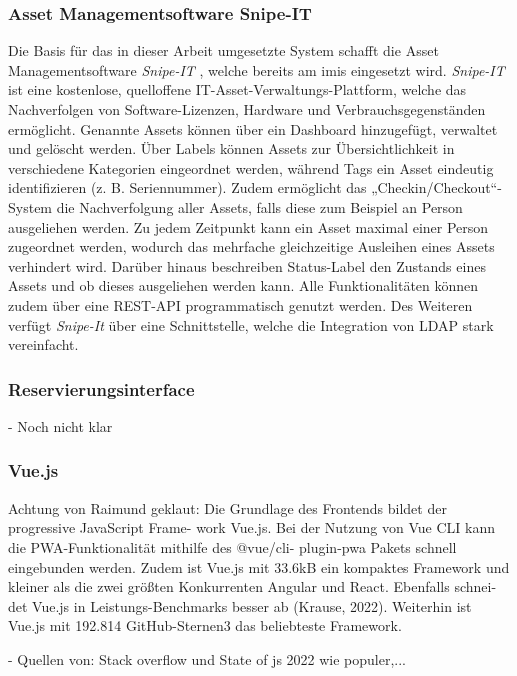 \subsubsection{Asset Managementsoftware Snipe-IT}

Die Basis für das in dieser Arbeit umgesetzte System schafft die Asset
Managementsoftware \textit{Snipe-IT} \cite{noauthor_home_nodate}, welche bereits
am \ac{imis} eingesetzt wird. \textit{Snipe-IT} ist eine kostenlose, quelloffene
IT-Asset-Verwaltungs-Plattform, welche das Nachverfolgen von Software-Lizenzen,
Hardware und Verbrauchsgegenständen ermöglicht. Genannte Assets können über ein
Dashboard hinzugefügt, verwaltet und gelöscht werden. Über Labels können Assets
zur Übersichtlichkeit in verschiedene Kategorien eingeordnet werden, während
Tags ein Asset eindeutig identifizieren (z. B. Seriennummer). Zudem ermöglicht
das „Checkin/Checkout“-System die Nachverfolgung aller Assets, falls diese zum
Beispiel an Person ausgeliehen werden. Zu jedem Zeitpunkt kann ein Asset maximal
einer Person zugeordnet werden, wodurch das mehrfache gleichzeitige Ausleihen
eines Assets verhindert wird. Darüber hinaus beschreiben Status-Label den
Zustands eines Assets und ob dieses ausgeliehen werden kann. Alle
Funktionalitäten können zudem über eine REST-API programmatisch genutzt werden.
Des Weiteren verfügt \textit{Snipe-It} über eine Schnittstelle, welche die
Integration von LDAP stark vereinfacht.

\subsubsection{Reservierungsinterface}
- Noch nicht klar

\subsubsection{Vue.js}
Achtung von Raimund geklaut: Die Grundlage des Frontends bildet der progressive
JavaScript Frame- work Vue.js. Bei der Nutzung von Vue CLI kann die
PWA-Funktionalität mithilfe des @vue/cli- plugin-pwa Pakets schnell eingebunden
werden. Zudem ist Vue.js mit 33.6kB ein kompaktes Framework und kleiner als die
zwei größten Konkurrenten Angular und React. Ebenfalls schnei- det Vue.js in
Leistungs-Benchmarks besser ab (Krause, 2022). Weiterhin ist Vue.js mit 192.814
GitHub-Sternen3 das beliebteste Framework.

- Quellen von: Stack overflow und State of js 2022 wie populer,...

